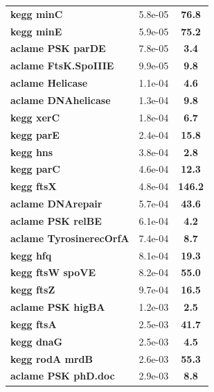 \begin{landscape}
\begin{table}
{\begin{minipage}[t]{0.3\textwidth}
\begin{tabular}{>{\bfseries}p{\textwidth}cc}
\rowcolor{posit}kegg minC&5.8e-05&\textbf{\colorbox{colorpowerxxxx}{76.8}}\\
\rowcolor{posit}kegg minE&5.9e-05&\textbf{\colorbox{colorpowerxxxx}{75.2}}\\
\rowcolor{posit}aclame PSK parDE&7.8e-05&\textbf{\colorbox{colorpowerx}{3.4}}\\
\rowcolor{posit}aclame FtsK.SpoIIIE&9.9e-05&\textbf{\colorbox{colorpowerxx}{9.8}}\\
\rowcolor{posit}aclame Helicase&1.1e-04&\textbf{\colorbox{colorpowerx}{4.6}}\\
\rowcolor{posit}aclame DNAhelicase&1.3e-04&\textbf{\colorbox{colorpowerxx}{9.8}}\\
\rowcolor{posit}kegg xerC&1.8e-04&\textbf{\colorbox{colorpowerx}{6.7}}\\
\rowcolor{posit}kegg parE&2.4e-04&\textbf{\colorbox{colorpowerxx}{15.8}}\\
\rowcolor{posit}kegg hns&3.8e-04&\textbf{\colorbox{colorpowerx}{2.8}}\\
\rowcolor{posit}kegg parC&4.6e-04&\textbf{\colorbox{colorpowerxx}{12.3}}\\
\rowcolor{posit}kegg ftsX&4.8e-04&\textbf{\colorbox{colorpowerxxxx}{146.2}}\\
\rowcolor{posit}aclame DNArepair&5.7e-04&\textbf{\colorbox{colorpowerxxx}{43.6}}\\
\rowcolor{posit}aclame PSK relBE&6.1e-04&\textbf{\colorbox{colorpowerx}{4.2}}\\
\rowcolor{posit}aclame TyrosinerecOrfA&7.4e-04&\textbf{\colorbox{colorpowerxx}{8.7}}\\
\rowcolor{posit}kegg hfq&8.1e-04&\textbf{\colorbox{colorpowerxx}{19.3}}\\
\rowcolor{posit}kegg ftsW spoVE&8.2e-04&\textbf{\colorbox{colorpowerxxxx}{55.0}}\\
\rowcolor{posit}kegg ftsZ&9.7e-04&\textbf{\colorbox{colorpowerxx}{16.5}}\\
\rowcolor{posit}aclame PSK higBA&1.2e-03&\textbf{\colorbox{colorpower}{2.5}}\\
\rowcolor{posit}kegg ftsA&2.5e-03&\textbf{\colorbox{colorpowerxxx}{41.7}}\\
\rowcolor{posit}kegg dnaG&2.5e-03&\textbf{\colorbox{colorpowerx}{4.5}}\\
\rowcolor{posit}kegg rodA mrdB&2.6e-03&\textbf{\colorbox{colorpowerxxxx}{55.3}}\\
\rowcolor{posit}aclame PSK phD.doc&2.9e-03&\textbf{\colorbox{colorpowerxx}{8.8}}\\

\end{tabular}
\end{minipage}}
\end{table}
\end{landscape}
